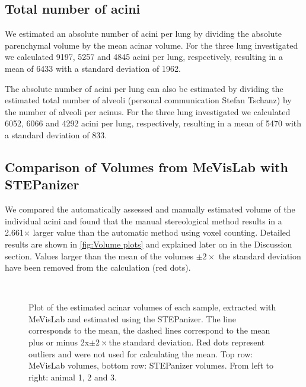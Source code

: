 \documentclass[a4paper,DIV=calc,abstract,english]{scrartcl}
\newcommand{\imsize}{\linewidth}
\newcommand{\biggerthan}{2} %
\newcommand{\totalnumberofaciniB}{9197}
\newcommand{\totalnumberofaciniD}{5257}
\newcommand{\totalnumberofaciniE}{4845}
\newcommand{\meantotalnumberofacini}{6433}
\newcommand{\meantotalnumberofaciniSTD}{1962} %
\newcommand{\totalnumberofaciniBVariant}{6052}
\newcommand{\totalnumberofaciniDVariant}{6066}
\newcommand{\totalnumberofaciniEVariant}{4292}
\newcommand{\meantotalnumberofaciniVariant}{5470}
\newcommand{\meantotalnumberofaciniSTDVariant}{833} %
\newcommand{\difference}{2.661} %
\begin{document}
\subsection{Total number of acini}\label{sec:results:total number of acini}
We estimated an absolute number of acini per lung by dividing the absolute parenchymal volume by the mean acinar volume.
For the three lung investigated we calculated \totalnumberofaciniB, \totalnumberofaciniD\xspace and \totalnumberofaciniE\xspace acini per lung, respectively, resulting in a mean of \meantotalnumberofacini\xspace with a standard deviation of \meantotalnumberofaciniSTD.

The absolute number of acini per lung can also be estimated by dividing the estimated total number of alveoli (personal communication Stefan Tschanz) by the number of alveoli per acinus.
For the three lung investigated we calculated \totalnumberofaciniBVariant, \totalnumberofaciniDVariant\xspace and \totalnumberofaciniEVariant\xspace acini per lung, respectively, resulting in a mean of \meantotalnumberofaciniVariant\xspace with a standard deviation of \meantotalnumberofaciniSTDVariant.

\subsection{Comparison of Volumes from MeVisLab with STEPanizer}
We compared the automatically assessed and manually estimated volume of the individual acini and found that the manual stereological method results in a \difference\(\times\) larger value than the automatic method using voxel counting.
Detailed results are shown in \autoref{fig:Volume plots} and explained later on in the Discussion section.
Values larger than the mean of the volumes \(\pm\biggerthan\times\) the standard deviation have been removed from the calculation (red dots).

\renewcommand{\imsize}{0.35\textwidth}
\begin{figure}[htb]
	\centering
	\subfloat{
		}\hfill%
	\subfloat{
		
		}\hfill%
	\subfloat{
		
		}\\%
	\subfloat{
		
		}\hfill%
	\subfloat{
		
		}\hfill%
	\subfloat{
		
		}%
	\caption{Plot of the estimated acinar volumes of each sample, extracted with MeVisLab and estimated using the STEPanizer. The line corresponds to the mean, the dashed lines correspond to the mean \ifJCS plus or minus \biggerthan x\xspace\else\(\pm\biggerthan\times\)\xspace\fi the standard deviation. Red dots represent outliers and were not used for calculating the mean. Top row: MeVisLab volumes, bottom row: STEPanizer volumes. From left to right: animal 1, 2 and 3.}
	\label{fig:Volume plots}
\end{figure}
\end{document}

